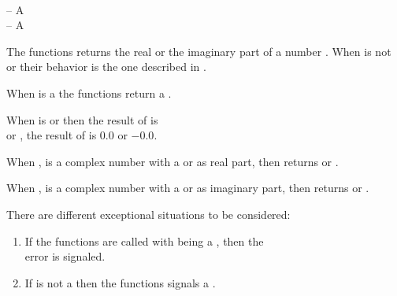\documentclass[../Type-Manipulation-Coercion.tex]{subfiles}
\begin{document}

\DSyntax{}

  \RArrow {}\\
  \RArrow {}

\DArgsNValues{}

 -- A \\
 -- A 

\DDescription{}

The functions returns the real or the imaginary part of a number .
When  is not  or 
their behavior is the one described in \cite{1996:ANSIHyperSpec}.

\noindent
When  is a  the functions return a
.

\noindent
When  is  or
 then the result of
 is\\
 or , the
result of  is $0.0$ or $-0.0$.

\noindent
When , is a complex number with a  or
 as real part, then  returns
 or .

\noindent
When , is a complex number with a  or
 as imaginary part, then  returns
 or .

\DExceptional{}

There are different exceptional situations to be considered:
\begin{enumerate}
\item If the functions are called with
   being a
  , then the\\
   error is signaled.
\item If  is not a \CL{}  then the functions
  signals a .
\end{enumerate}
\end{document}
